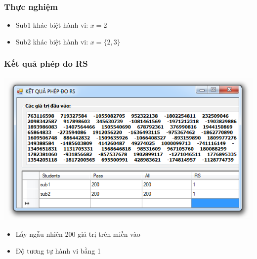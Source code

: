 \documentclass{beamer}
\begin{document}
\begin{frame}
  \frametitle{Thực nghiệm}
  \begin{minipage}[t]{0.32\linewidth}
  	\centering
  	
  \end{minipage}%
  \hfill\vrule\hfill
  \begin{minipage}[t]{0.32\linewidth}
  	\centering
  	
  \end{minipage}%
  \hfill\vrule\hfill
  \begin{minipage}[t]{0.32\linewidth}
  	\centering
  	
  \end{minipage}%
	\pause
	\begin{itemize}
		\item Sub1 khác biệt hành vi: $ x = 2$ \pause
		\item Sub2 khác biệt hành vi: $ x = \{2, 3\}$
	\end{itemize}
\end{frame}

\begin{frame}
\frametitle{Kết quả phép đo RS}
\centering \includegraphics[width=0.8\linewidth]{images/kq_rs.png}
\begin{itemize}
	\item Lấy ngẫu nhiên 200 giá trị trên miền vào
	\item Độ tương tự hành vi bằng 1
\end{itemize}
\end{frame}
\end{document}
